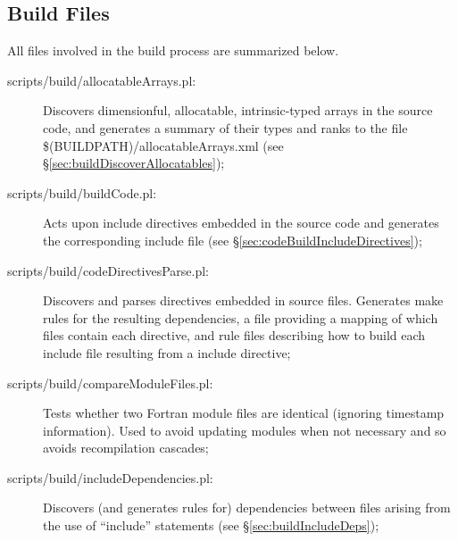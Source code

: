 \subsection{Build Files}

All files involved in the build process are summarized below.

\begin{description}

\item[{\normalfont \ttfamily scripts/build/allocatableArrays.pl}:] Discovers dimensionful, allocatable, intrinsic-typed arrays in the source code, and generates a summary of their types and ranks to the file {\normalfont \ttfamily \$(BUILDPATH)/allocatableArrays.xml} (see \S\ref{sec:buildDiscoverAllocatables});
  
\item[{\normalfont \ttfamily scripts/build/buildCode.pl}:] Acts upon {\normalfont \ttfamily include} directives embedded in the source code and generates the corresponding include file (see \S\ref{sec:codeBuildIncludeDirectives});

\item[{\normalfont \ttfamily scripts/build/codeDirectivesParse.pl}:] Discovers and parses directives embedded in source files. Generates {\normalfont \ttfamily make} rules for the resulting dependencies, a file providing a mapping of which files contain each directive, and rule files describing how to build each include file resulting from a {\normalfont \ttfamily include} directive;

\item[{\normalfont \ttfamily scripts/build/compareModuleFiles.pl}:] Tests whether two Fortran module files are identical (ignoring timestamp information). Used to avoid updating modules when not necessary and so avoids recompilation cascades;

\item[{\normalfont \ttfamily scripts/build/includeDependencies.pl}:] Discovers (and generates rules for) dependencies between files arising from the use of ``{\normalfont \ttfamily include}'' statements (see \S\ref{sec:buildIncludeDeps});
  

\end{description}
